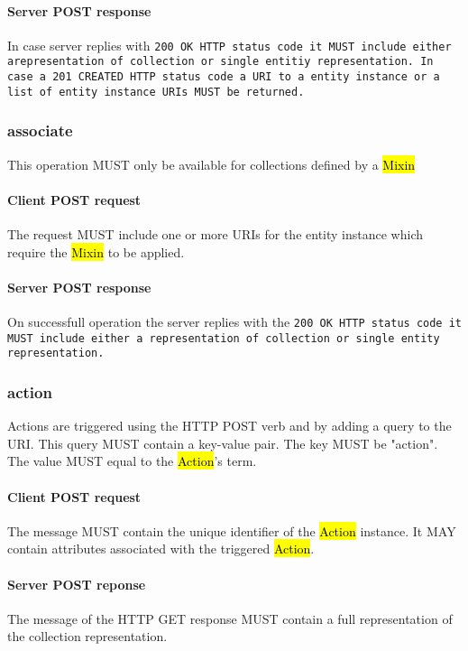 \documentclass[10pt,a4paper]{article}
\begin{document}
\paragraph{Server POST response}
In case server replies with \tt{200 OK} HTTP status code it MUST include either arepresentation of collection or single entitiy representation. In case a \tt{201 CREATED} HTTP status code a URI to a entity instance or a list of entity instance URIs MUST be returned.

\subsubsection{associate}
This operation MUST only be available for collections defined by a \hl{Mixin}

\paragraph{Client POST request}
The request MUST include one or more URIs for the entity instance which require the \hl{Mixin} to be applied.

\paragraph{Server POST response}
On successfull operation the server replies with the \tt{200 OK} HTTP status code it MUST include either a representation of collection or single entity representation. 

\subsubsection{action}
Actions are triggered using the HTTP POST verb and by adding a query to the URI. This query MUST contain a key-value pair. The key MUST be "action". The value MUST equal to the \hl{Action}'s term.

\paragraph{Client POST request}
The message MUST contain the unique identifier of the \hl{Action} instance. It MAY contain attributes associated with the triggered \hl{Action}.

\paragraph{Server POST reponse}
The message of the HTTP GET response MUST contain a full representation of the collection representation.
\end{document}
